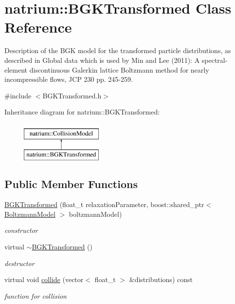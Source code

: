 \hypertarget{classnatrium_1_1BGKTransformed}{\section{natrium\-:\-:\-B\-G\-K\-Transformed \-Class \-Reference}
\label{classnatrium_1_1BGKTransformed}
}


\-Description of the \-B\-G\-K model for the transformed particle distributions, as described in \-Global data which is used by \-Min and \-Lee (2011)\-: \-A spectral-\/element discontinuous \-Galerkin lattice \-Boltzmann method for nearly incompressible flows, \-J\-C\-P 230 pp. 245-\/259.  




{\ttfamily \#include $<$\-B\-G\-K\-Transformed.\-h$>$}

\-Inheritance diagram for natrium\-:\-:\-B\-G\-K\-Transformed\-:\begin{figure}[H]
\begin{center}
\leavevmode
\includegraphics[height=2.000000cm]{classnatrium_1_1BGKTransformed}
\end{center}
\end{figure}
\subsection*{\-Public \-Member \-Functions}
\begin{DoxyCompactItemize}
\item 
\hyperlink{classnatrium_1_1BGKTransformed_adb6cc9b3a10e88f5d1e938cf8d2d9582}{\-B\-G\-K\-Transformed} (float\-\_\-t relaxation\-Parameter, boost\-::shared\-\_\-ptr$<$ \hyperlink{classnatrium_1_1BoltzmannModel}{\-Boltzmann\-Model} $>$ boltzmann\-Model)
\begin{DoxyCompactList}\small\item\em constructor \end{DoxyCompactList}\item 
\hypertarget{classnatrium_1_1BGKTransformed_a554c68facfbd2b126f24504f215eb193}{virtual \hyperlink{classnatrium_1_1BGKTransformed_a554c68facfbd2b126f24504f215eb193}{$\sim$\-B\-G\-K\-Transformed} ()}\label{classnatrium_1_1BGKTransformed_a554c68facfbd2b126f24504f215eb193}

\begin{DoxyCompactList}\small\item\em destructor \end{DoxyCompactList}\item 
virtual void \hyperlink{classnatrium_1_1BGKTransformed_a6ad393c3fde6ccc10e1de644dd7767e9}{collide} (vector$<$ float\-\_\-t $>$ \&distributions) const 
\begin{DoxyCompactList}\small\item\em function for collision \end{DoxyCompactList}\end{DoxyCompactItemize}



